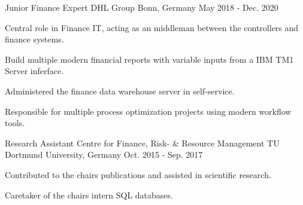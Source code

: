 \begin{cventries}
  
\cventry
  {Junior Finance Expert} %
  {DHL Group} %
  {Bonn, Germany} %
  {May 2018 - Dec. 2020} %
  {
    \begin{cvitems} %
      \item {Central role in Finance IT, acting as an middleman between the controllers and finance systems.}
      \item {Build multiple modern financial reports with variable inputs from a IBM TM1 Server inferface.}
      \item {Administered the finance data warehouse server in self-service.}
      \item {Responsible for multiple process optimization projects using modern workflow tools.}
    \end{cvitems}
  }

\cventry
{Research Assistant} %
{Centre for Finance, Risk- \& Resource Management} %
{TU Dortmund University, Germany} %
{Oct. 2015 - Sep. 2017} %
{
  \begin{cvitems} %
    \item {Contributed to the chairs publications and assisted in scientific research.
    }
    \item {Caretaker of the chairs intern SQL databases.}
  \end{cvitems}
}

\end{cventries}
